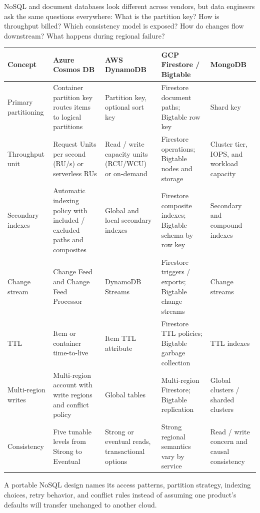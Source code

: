 \begin{crosscloud}
NoSQL and document databases look different across vendors, but data engineers ask the same questions everywhere: What is the partition key? How is throughput billed? Which consistency model is exposed? How do changes flow downstream? What happens during regional failure?

\vspace{2mm}
{\footnotesize
\begin{tabular}{@{}p{2.7cm}p{2.9cm}p{2.9cm}p{3.0cm}p{2.8cm}@{}}
\toprule
\textbf{Concept} & \textbf{Azure Cosmos DB} & \textbf{AWS DynamoDB} & \textbf{GCP Firestore / Bigtable} & \textbf{MongoDB} \\
\midrule
Primary partitioning & Container partition key routes items to logical partitions & Partition key, optional sort key & Firestore document paths; Bigtable row key & Shard key \\
Throughput unit & Request Units per second (RU/s) or serverless RUs & Read / write capacity units (RCU/WCU) or on-demand & Firestore operations; Bigtable nodes and storage & Cluster tier, IOPS, and workload capacity \\
Secondary indexes & Automatic indexing policy with included / excluded paths and composites & Global and local secondary indexes & Firestore composite indexes; Bigtable schema by row key & Secondary and compound indexes \\
Change stream & Change Feed and Change Feed Processor & DynamoDB Streams & Firestore triggers / exports; Bigtable change streams & Change streams \\
TTL & Item or container time-to-live & Item TTL attribute & Firestore TTL policies; Bigtable garbage collection & TTL indexes \\
Multi-region writes & Multi-region account with write regions and conflict policy & Global tables & Multi-region Firestore; Bigtable replication & Global clusters / sharded clusters \\
Consistency & Five tunable levels from Strong to Eventual & Strong or eventual reads, transactional options & Strong regional semantics vary by service & Read / write concern and causal consistency \\
\bottomrule
\end{tabular}}

\vspace{1mm}
A portable NoSQL design names its access patterns, partition strategy, indexing choices, retry behavior, and conflict rules instead of assuming one product's defaults will transfer unchanged to another cloud.
\end{crosscloud}

